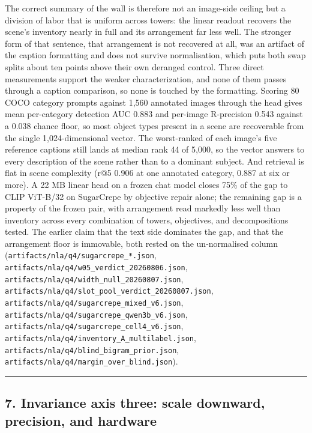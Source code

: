 \documentclass[
  11pt,
]{article}
\newcounter{none} %
\begin{document}
The correct summary of the wall is therefore not an image-side ceiling
but a division of labor that is uniform across towers: the linear
readout recovers the scene's inventory nearly in full and its
arrangement far less well. The stronger form of that sentence, that
arrangement is not recovered at all, was an artifact of the caption
formatting and does not survive normalisation, which puts both swap
splits about ten points above their own deranged control. Three direct
measurements support the weaker characterization, and none of them
passes through a caption comparison, so none is touched by the
formatting. Scoring 80 COCO category prompts against 1,560 annotated
images through the head gives mean per-category detection AUC 0.883 and
per-image R-precision 0.543 against a 0.038 chance floor, so most object
types present in a scene are recoverable from the single
1,024-dimensional vector. The worst-ranked of each image's five
reference captions still lands at median rank 44 of 5,000, so the vector
answers to every description of the scene rather than to a dominant
subject. And retrieval is flat in scene complexity (r@5 0.906 at one
annotated category, 0.887 at six or more). A 22 MB linear head on a
frozen chat model closes 75\% of the gap to CLIP ViT-B/32 on SugarCrepe
by objective repair alone; the remaining gap is a property of the frozen
pair, with arrangement read markedly less well than inventory across
every combination of towers, objectives, and decompositions tested. The
earlier claim that the text side dominates the gap, and that the
arrangement floor is immovable, both rested on the un-normalised column
(\texttt{artifacts/nla/q4/sugarcrepe\_*.json},
\texttt{artifacts/nla/q4/w05\_verdict\_20260806.json},
\texttt{artifacts/nla/q4/width\_null\_20260807.json},
\texttt{artifacts/nla/q4/slot\_pool\_verdict\_20260807.json},
\texttt{artifacts/nla/q4/sugarcrepe\_mixed\_v6.json},
\texttt{artifacts/nla/q4/sugarcrepe\_qwen3b\_v6.json},
\texttt{artifacts/nla/q4/sugarcrepe\_cell4\_v6.json},
\texttt{artifacts/nla/q4/inventory\_A\_multilabel.json},
\texttt{artifacts/nla/q4/blind\_bigram\_prior.json},
\texttt{artifacts/nla/q4/margin\_over\_blind.json}).

\begin{center}\rule{0.5\linewidth}{0.5pt}\end{center}

\subsection{7. Invariance axis three: scale downward, precision, and
hardware}\label{invariance-axis-three-scale-downward-precision-and-hardware}
\end{document}
